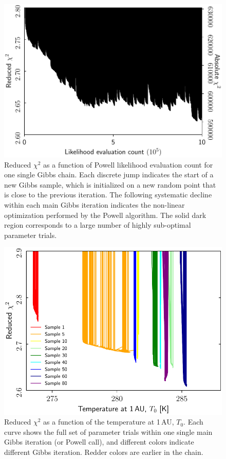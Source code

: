 \documentclass[twocolumn]{aa}
\begin{document}
\begin{figure}
    \centering
    \includegraphics[width=\linewidth]{figs/powell_red_chisq_vs_iter.pdf}
    \caption{Reduced $\chi^2$ as a function of Powell likelihood evaluation count for one single Gibbs chain. Each discrete jump indicates the start of a new Gibbs sample, which is initialized on a new random point that is close to the previous iteration. The following systematic decline within each main Gibbs iteration indicates the non-linear optimization performed by the Powell algorithm.  The solid dark region corresponds to a large number of highly sub-optimal parameter trials. }
    \label{fig:powell_chisq_iter}
\end{figure}


\begin{figure}
    \centering
    \includegraphics[width=\linewidth]{figs/powell_T0_vs_chisq.pdf}
    \caption{Reduced $\chi^2$ as a function of the temperature at 1\,AU, $T_0$. Each curve shows the full set of parameter trials within one single main Gibbs iteration (or Powell call), and different colors indicate different Gibbs iteration. Redder colors are earlier in the chain.}
    \label{fig:powell_T0}
\end{figure}
\end{document}
